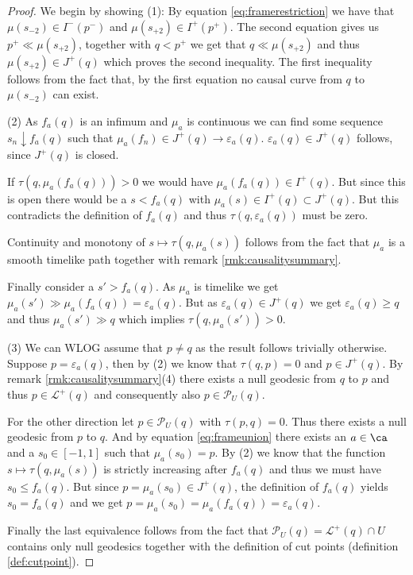 \begin{proof}
We begin by showing (1): By equation \eqref{eq:framerestriction} we have that $\mu(s_{-2})\in I^-(p^-)$ and $\mu(s_{+2})\in I^+(p^+)$. The second equation gives us $p^+\ll \mu(s_{+2})$, together with $q<p^+$ we get that $q\ll \mu(s_{+2})$ and thus $\mu(s_{+2})\in J^+(q)$ which proves the second inequality. The first inequality follows from the fact that, by the first equation no causal curve from $q$ to $\mu(s_{-2})$ can exist.

(2) As $f_a(q)$ is an infimum and $\mu_a$ is continuous we can find some sequence $s_n\downarrow f_a(q)$ such that $\mu_a(f_n) \in J^+(q) \to \varepsilon_a(q)$. $\varepsilon_a(q)\in J^+(q)$ follows, since $J^+(q)$ is closed. 

If $\tau(q,\mu_a(f_a(q)))>0$ we would have $\mu_a(f_a(q))\in I^+(q)$. But since this is open there would be a $s<f_a(q)$ with $\mu_a(s)\in I^+(q) \subset J^+(q)$. But this contradicts the definition of $f_a(q)$ and thus $\tau(q,\varepsilon_a(q))$ must be zero.

Continuity and monotony of $s\mapsto \tau(q,\mu_a(s))$ follows from the fact that $\mu_a$ is a smooth timelike path together with remark \ref{rmk:causalitysummary}.

Finally consider a $s'>f_a(q)$. As $\mu_a$ is timelike we get $\mu_a(s')\gg \mu_a(f_a(q)) = \varepsilon_a(q)$. But as $\varepsilon_a(q)\in J^+(q)$ we get $\varepsilon_a(q) \geq q$ and thus $\mu_a(s') \gg  q$ which implies $\tau(q,\mu_a(s'))>0$.

(3) We can WLOG assume that $p\neq q$ as the result follows trivially otherwise. Suppose $p=\varepsilon_a(q)$, then by (2) we know that $\tau(q,p)=0$ and $p\in J^+(q)$. By remark \ref{rmk:causalitysummary}(4) there exists a null geodesic from $q$ to $p$ and thus $p\in \mathcal{L}^+(q)$ and consequently also $p\in \mathcal{P}_U(q)$. 

For the other direction let $p\in \mathcal{P}_U(q)$ with $\tau(p,q)=0$. Thus there exists a null geodesic from $p$ to $q$. And by equation \eqref{eq:frameunion} there exists an $a\in \ca$ and a $s_0\in [-1,1]$ such that $\mu_a(s_0)=p$.
By (2) we know that the function $s\mapsto \tau(q,\mu_a(s))$ is strictly increasing after $f_a(q)$ and thus we must have $s_0\leq f_a(q)$. But since $p=\mu_a(s_0) \in J^+(q)$, the definition of $f_a(q)$ yields $s_0=f_a(q)$ and we get $p=\mu_a(s_0) = \mu_a(f_a(q)) = \varepsilon_a(q)$.

Finally the last equivalence follows from the fact that $\mathcal{P}_U(q) = \mathcal{L}^+(q)\cap U$ contains only null geodesics together with the definition of cut points (definition \ref{def:cutpoint}).


\end{proof}
